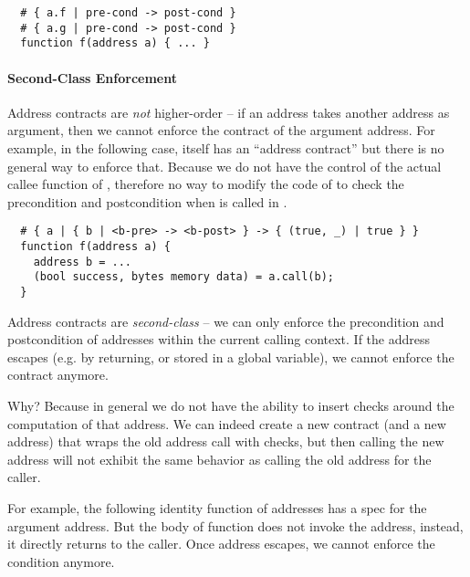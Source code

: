 
\begin{lstlisting}
  # { a.f | pre-cond -> post-cond }
  # { a.g | pre-cond -> post-cond }
  function f(address a) { ... }
\end{lstlisting}

\fi

\paragraph{Second-Class Enforcement}
Address contracts are \emph{not} higher-order -- if an address takes another
address as argument, then we cannot enforce the contract of the argument
address.
For example, in the following case,  itself has an ``address contract''
 but there is no general way to enforce that.
Because we do not have the control of the actual callee function of ,
therefore no way to modify the code of  to check the precondition
and postcondition when  is called in .

\begin{lstlisting}
  # { a | { b | <b-pre> -> <b-post> } -> { (true, _) | true } }
  function f(address a) {
    address b = ...
    (bool success, bytes memory data) = a.call(b);
  }
\end{lstlisting}

Address contracts are \emph{second-class} -- we can only enforce the
precondition and postcondition of addresses within the current calling
context.  If the address escapes (e.g. by returning, or stored in a global
variable), we cannot enforce the contract anymore.

Why? Because in general we do not have the ability to insert checks around the
computation of that address. We can indeed create a new contract (and a new address) that wraps the old address call with checks, but then calling
the new address will not exhibit the same behavior as calling the old address
for the caller.

For example, the following identity function of addresses has a spec
for the argument address. But the body of function does not invoke
the address, instead, it directly returns  to the caller.
Once address  escapes, we cannot enforce the condition anymore.

